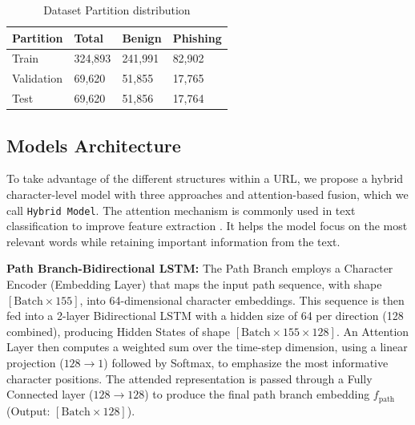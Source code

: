 \documentclass[conference]{IEEEtran}
\begin{document}
\begin{table}[htbp]
\caption{Dataset Partition distribution }
\label{tab:dataset_partition}
\centering
\begin{tabular}{llll}
\hline
\textbf{Partition} & \textbf{Total} & \textbf{Benign} & \textbf{Phishing} \\ \hline
Train & 324,893 & 241,991 & 82,902 \\
Validation & 69,620 & 51,855 & 17,765 \\
Test & 69,620 & 51,856 & 17,764 \\ \hline
\end{tabular}
\end{table}

\subsection{Models Architecture}
To take advantage of the different structures within a URL, we propose a hybrid character-level model with three approaches and attention-based fusion, which we call \texttt{Hybrid Model}. The attention mechanism is commonly used in text classification to improve feature extraction \cite{zhou} \cite{Yan}. It helps the model focus on the most relevant words while retaining important information from the text.





    \item \textbf{Path Branch-Bidirectional LSTM:} The Path Branch employs a Character Encoder (Embedding Layer) that maps the input path sequence, with shape $[\text{Batch} \times 155]$, into 64-dimensional character embeddings. This sequence is then fed into a 2-layer Bidirectional LSTM with a hidden size of 64 per direction (128 combined), producing Hidden States of shape $[\text{Batch} \times 155 \times 128]$. An Attention Layer then computes a weighted sum over the time-step dimension, using a linear projection ($128 \rightarrow 1$) followed by Softmax, to emphasize the most informative character positions. The attended representation is passed through a Fully Connected layer ($128 \rightarrow 128$) to produce the final path branch embedding $f_{\text{path}}$ (Output: $[\text{Batch} \times 128]$).
\end{document}
